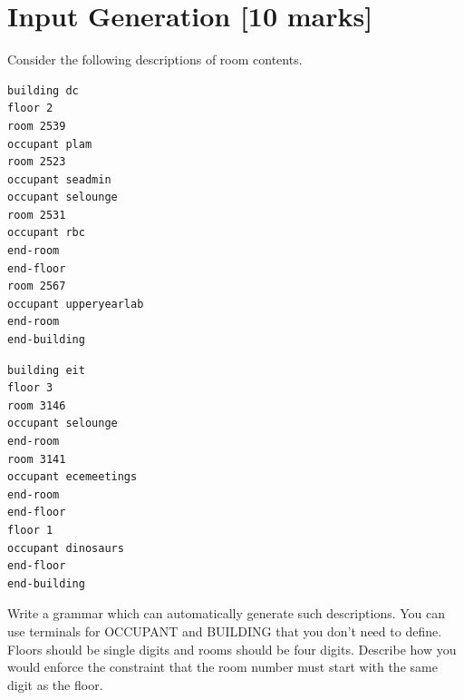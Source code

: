 \documentclass[12pt]{article}
\begin{document}
\section{Input Generation [10 marks]}

Consider the following descriptions of room contents.
\begin{center}
\begin{minipage}{.3\textwidth}
\begin{lstlisting}
building dc
floor 2
room 2539
occupant plam
room 2523
occupant seadmin
occupant selounge
room 2531
occupant rbc
end-room
end-floor
room 2567
occupant upperyearlab
end-room
end-building
\end{lstlisting}
\end{minipage}\begin{minipage}{.3\textwidth} \begin{lstlisting}
building eit
floor 3
room 3146
occupant selounge
end-room
room 3141
occupant ecemeetings
end-room
end-floor
floor 1
occupant dinosaurs
end-floor
end-building
\end{lstlisting}
\end{minipage}
\end{center}
Write a grammar which can automatically generate such descriptions.
You can use terminals for OCCUPANT and BUILDING that you don't need to define.
Floors should be single digits and rooms should be four digits.
Describe how you would enforce the constraint that the room number
must start with the same digit as the floor.

\newpage
\end{document}
